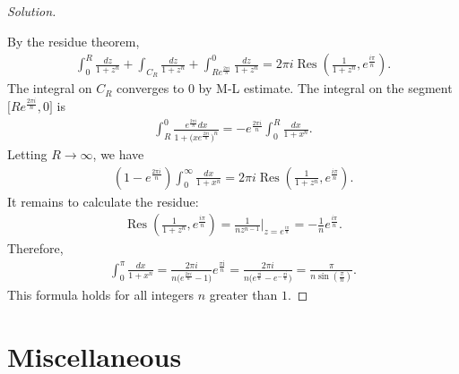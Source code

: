\documentclass{article}
\numberwithin{equation}{section}
\DeclareMathOperator{\res}{Res}
\renewcommand{\i}{\mathrm{i}}
\theoremstyle{plain}
\theoremstyle{definition}
\begin{document}
\begin{proof}[Solution]
\begin{center}
\end{center}
By the residue theorem,
\begin{align*}
	\int_0^R\frac{dz}{1+z^n}+\int_{C_R}\frac{dz}{1+z^n}+\int_{Re^{\frac{2\pi i}{n}}}^0\frac{dz}{1+z^n}=2\pi i\res\left(\frac{1}{1+z^n},e^{\frac{i\pi}{n}}\right).
\end{align*}
The integral on $C_R$ converges to $0$ by M-L estimate. The integral on the segment $\bigl[Re^{\frac{2\pi i}{n}},0\bigr]$ is
\begin{align*}
	\int_R^0\frac{e^{\frac{2\pi i}{n}}dx}{1+\bigl(xe^{\frac{2\pi i}{n}}\bigr)^n}=-e^{\frac{2\pi i}{n}}\int_0^R\frac{dx}{1+x^n}.
\end{align*}
Letting $R\to\infty$, we have
\begin{align*}
	\left(1-e^{\frac{2\pi i}{n}}\right)\int_0^\infty\frac{dx}{1+x^n}=2\pi i\res\left(\frac{1}{1+z^n},e^{\frac{i\pi}{n}}\right).
\end{align*}
It remains to calculate the residue:
\begin{align*}
	\res\left(\frac{1}{1+z^n},e^{\frac{i\pi}{n}}\right)=\frac{1}{nz^{n-1}}\bigg|_{z=e^{\frac{i\pi}{n}}}=-\frac{1}{n}e^{\frac{i\pi}{n}}.
\end{align*}
Therefore,
\begin{align*}
	\int_0^\pi\frac{dx}{1+x^n}=\frac{2\pi i}{n\bigl(e^{\frac{2\pi i}{n}}-1\bigr)}e^{\frac{\pi\i}{n}}=\frac{2\pi i}{n\bigl(e^{\frac{\pi\i}{n}}-e^{-\frac{\pi\i}{n}}\bigr)}=\frac{\pi}{n\sin\left(\frac{\pi}{n}\right)}.
\end{align*}
This formula holds for all integers $n$ greater than $1$.
\end{proof}

\newpage
\section{Miscellaneous}
\end{document}
